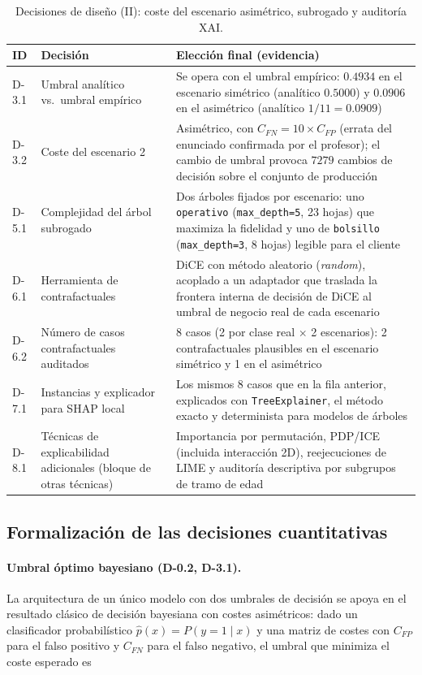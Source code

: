 \documentclass[11pt,a4paper]{article}
\begin{document}
\begin{table}[H]
\centering
\footnotesize
\caption{Decisiones de diseño (II): coste del escenario asimétrico, subrogado y auditoría XAI.}
\label{tab:decisiones-2}
\begin{tabular}{p{1.6cm}p{4.4cm}p{7.5cm}}
\toprule
ID & Decisión & Elección final (evidencia) \\
\midrule
D-3.1 & Umbral analítico vs.\ umbral empírico & Se opera con el umbral empírico: $0.4934$ en el
escenario simétrico (analítico $0.5000$) y $0.0906$ en el asimétrico (analítico $1/11=0.0909$) \\
D-3.2 & Coste del escenario 2 & Asimétrico, con $C_{FN}=10 \times C_{FP}$ (errata del enunciado
confirmada por el profesor); el cambio de umbral provoca $7279$ cambios de decisión sobre el
conjunto de producción \\
D-5.1 & Complejidad del árbol subrogado & Dos árboles fijados por escenario: uno
\texttt{operativo} (\texttt{max\_depth=5}, 23 hojas) que maximiza la fidelidad y uno de
\texttt{bolsillo} (\texttt{max\_depth=3}, 8 hojas) legible para el cliente \\
D-6.1 & Herramienta de contrafactuales & DiCE con método aleatorio (\emph{random}), acoplado a un
adaptador que traslada la frontera interna de decisión de DiCE al umbral de negocio real de cada
escenario \\
D-6.2 & Número de casos contrafactuales auditados & 8 casos (2 por clase real $\times$ 2
escenarios): 2 contrafactuales plausibles en el escenario simétrico y 1 en el asimétrico \\
D-7.1 & Instancias y explicador para SHAP local & Los mismos 8 casos que en la fila anterior,
explicados con \texttt{TreeExplainer}, el método exacto y determinista para modelos de árboles \\
D-8.1 & Técnicas de explicabilidad adicionales (bloque de otras técnicas) & Importancia por
permutación, PDP/ICE (incluida interacción 2D), reejecuciones de LIME y auditoría descriptiva por
subgrupos de tramo de edad \\
\bottomrule
\end{tabular}
\end{table}

\subsection{Formalización de las decisiones cuantitativas}

\paragraph{Umbral óptimo bayesiano (D-0.2, D-3.1).} La arquitectura de un único modelo con dos
umbrales de decisión se apoya en el resultado clásico de decisión bayesiana con costes
asimétricos: dado un clasificador probabilístico $\hat p(x)=P(y=1\mid x)$ y una matriz de costes
con $C_{FP}$ para el falso positivo y $C_{FN}$ para el falso negativo, el umbral que minimiza el
coste esperado es
\end{document}
